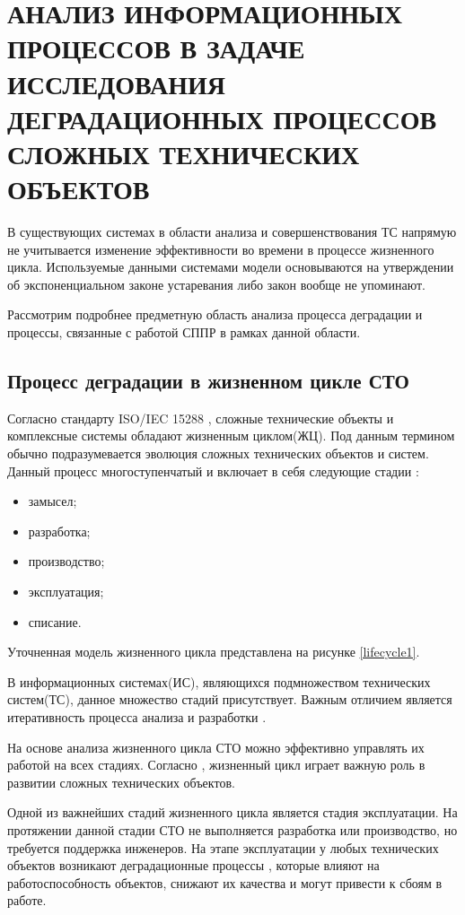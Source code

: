 \section{АНАЛИЗ ИНФОРМАЦИОННЫХ ПРОЦЕССОВ В ЗАДАЧЕ ИССЛЕДОВАНИЯ ДЕГРАДАЦИОННЫХ ПРОЦЕССОВ СЛОЖНЫХ ТЕХНИЧЕСКИХ ОБЪЕКТОВ}
 
В существующих системах в области анализа и совершенствования ТС напрямую не учитывается изменение эффективности во времени в процессе жизненного цикла. 
Используемые данными системами модели основываются на утверждении об экспоненциальном законе устаревания либо закон вообще не упоминают. 

Рассмотрим подробнее предметную область анализа процесса деградации и процессы, связанные с работой СППР в рамках данной области.

\subsection{Процесс деградации в жизненном цикле СТО}
Согласно стандарту ISO/IEC 15288 \cite{FederalLaw,ISO}, сложные технические объекты и комплексные системы обладают жизненным циклом(ЖЦ).
Под данным термином обычно подразумевается эволюция сложных технических объектов и систем.
Данный процесс многоступенчатый и включает в себя следующие стадии \cite{Dagabyan}:
\begin{itemize}
    \item замысел;
    \item разработка;
    \item производство;
    \item эксплуатация;
    \item списание.
\end{itemize}
Уточненная модель жизненного цикла представлена на рисунке \ref{lifecycle1}.


В информационных системах(ИС), являющихся подмножеством технических систем(ТС), данное множество стадий присутствует.
Важным отличием является итеративность процесса анализа и разработки \cite{Dagabyan}.

На основе анализа жизненного цикла СТО можно эффективно управлять их работой на всех стадиях.
Согласно \cite{Doronina}, жизненный цикл играет важную роль в развитии сложных технических объектов.

Одной из важнейших стадий жизненного цикла является стадия эксплуатации.
На протяжении данной стадии СТО не выполняется разработка или производство,
но требуется поддержка инженеров. 
На этапе эксплуатации у любых технических объектов возникают деградационные процессы \cite{Miroshnikova}, которые влияют на работоспособность объектов, снижают их качества и могут привести к сбоям в работе.

